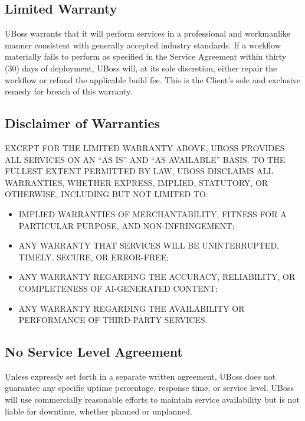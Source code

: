 \documentclass[11pt,letterpaper,parskip=half]{scrartcl}
\begin{document}
\subsection{Limited Warranty}

UBoss warrants that it will perform services in a professional and workmanlike manner consistent with generally accepted industry standards. If a workflow materially fails to perform as specified in the Service Agreement within thirty (30) days of deployment, UBoss will, at its sole discretion, either repair the workflow or refund the applicable build fee. This is the Client's sole and exclusive remedy for breach of this warranty.

\subsection{Disclaimer of Warranties}

\begin{tcolorbox}[keyterm, colback=white, colframe=charcoal, boxrule=0.8pt]
EXCEPT FOR THE LIMITED WARRANTY ABOVE, UBOSS PROVIDES ALL SERVICES ON AN ``AS IS'' AND ``AS AVAILABLE'' BASIS. TO THE FULLEST EXTENT PERMITTED BY LAW, UBOSS DISCLAIMS ALL WARRANTIES, WHETHER EXPRESS, IMPLIED, STATUTORY, OR OTHERWISE, INCLUDING BUT NOT LIMITED TO:

\begin{itemize}[nosep, leftmargin=1.5em]
    \item IMPLIED WARRANTIES OF MERCHANTABILITY, FITNESS FOR A PARTICULAR PURPOSE, AND NON-INFRINGEMENT;
    \item ANY WARRANTY THAT SERVICES WILL BE UNINTERRUPTED, TIMELY, SECURE, OR ERROR-FREE;
    \item ANY WARRANTY REGARDING THE ACCURACY, RELIABILITY, OR COMPLETENESS OF AI-GENERATED CONTENT;
    \item ANY WARRANTY REGARDING THE AVAILABILITY OR PERFORMANCE OF THIRD-PARTY SERVICES.
\end{itemize}
\end{tcolorbox}

\subsection{No Service Level Agreement}

Unless expressly set forth in a separate written agreement, UBoss does not guarantee any specific uptime percentage, response time, or service level. UBoss will use commercially reasonable efforts to maintain service availability but is not liable for downtime, whether planned or unplanned.
\end{document}
